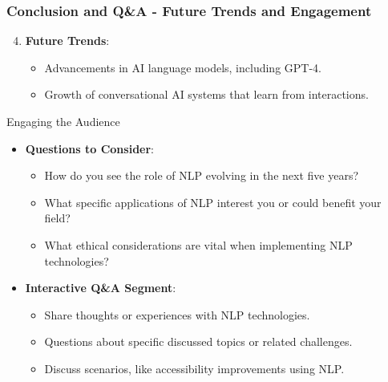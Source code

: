 \documentclass[aspectratio=169]{beamer}
\begin{document}
\begin{frame}[fragile]
    \frametitle{Conclusion and Q\&A - Future Trends and Engagement}
    \begin{enumerate}
        \setcounter{enumi}{3} %
        \item \textbf{Future Trends}:
            \begin{itemize}
                \item Advancements in AI language models, including GPT-4.
                \item Growth of conversational AI systems that learn from interactions.
            \end{itemize}
    \end{enumerate}
    \begin{block}{Engaging the Audience}
        \begin{itemize}
            \item \textbf{Questions to Consider}:
                \begin{itemize}
                    \item How do you see the role of NLP evolving in the next five years?
                    \item What specific applications of NLP interest you or could benefit your field?
                    \item What ethical considerations are vital when implementing NLP technologies?
                \end{itemize}
            \item \textbf{Interactive Q\&A Segment}:
                \begin{itemize}
                    \item Share thoughts or experiences with NLP technologies.
                    \item Questions about specific discussed topics or related challenges.
                    \item Discuss scenarios, like accessibility improvements using NLP.
                \end{itemize}
        \end{itemize}
    \end{block}
\end{frame}
\end{document}
